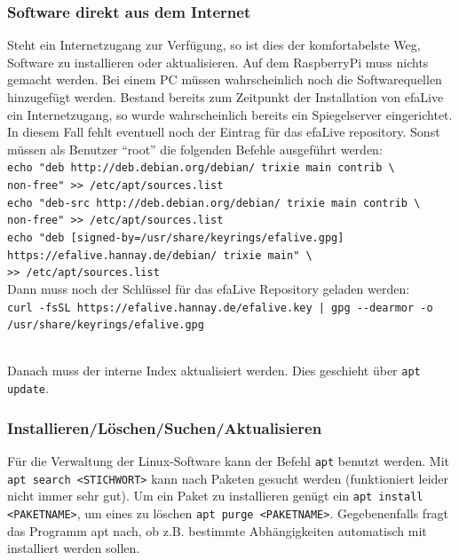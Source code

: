 \documentclass[a4paper,12pt,twoside]{article}
\begin{document}
\subsubsection{Software direkt aus dem Internet}
\label{sct:software_internet}
Steht ein Internetzugang zur Verfügung, so ist dies der komfortabelste
Weg, Software zu installieren oder aktualisieren. Auf dem RaspberryPi 
muss nichts gemacht werden. Bei einem PC müssen wahrscheinlich noch die
Softwarequellen hinzugefügt werden. Bestand bereits zum
Zeitpunkt der Installation von efaLive ein Internetzugang, so wurde
wahrscheinlich bereits ein Spiegelserver eingerichtet. In diesem Fall fehlt
eventuell noch der Eintrag für das efaLive repository. Sonst müssen als
Benutzer "`root"' die folgenden Befehle ausgeführt werden:
\bigskip
\\
\texttt{echo "deb http://deb.debian.org/debian/ trixie main contrib \textbackslash\\
    non-free"\ {\textgreater}{\textgreater} /etc/apt/sources.list}
\\
\texttt{echo "deb-src http://deb.debian.org/debian/ trixie main contrib \textbackslash\\
    non-free"\ {\textgreater}{\textgreater} /etc/apt/sources.list}
\\
\texttt{echo "deb [signed-by=/usr/share/keyrings/efalive.gpg] https://efalive.hannay.de/debian/ trixie main" \textbackslash\\
    {\textgreater}{\textgreater} /etc/apt/sources.list}  
\bigskip
\\  
Dann muss noch der Schlüssel für das efaLive Repository geladen werden:
\bigskip
\\
\texttt{curl -fsSL https://efalive.hannay.de/efalive.key | gpg -{}-dearmor -o /usr/share/keyrings/efalive.gpg}

\bigskip
\\
Danach muss der interne Index aktualisiert werden. Dies geschieht über
\texttt{apt update}.


\subsubsection{Installieren/Löschen/Suchen/Aktualisieren}
\label{sct:software_install}
Für die Verwaltung der
Linux-Software kann der Befehl \texttt{apt}
benutzt werden. Mit \texttt{apt search
{\textless}STICHWORT{\textgreater}} kann nach Paketen
gesucht werden (funktioniert leider nicht immer sehr gut). Um ein Paket
zu installieren genügt ein \texttt{apt install
{\textless}PAKETNAME{\textgreater}}, um eines zu löschen
\texttt{apt purge
{\textless}PAKETNAME{\textgreater}}. Gegebenenfalls fragt
das Programm apt nach, ob z.B. bestimmte Abhängigkeiten
automatisch mit installiert werden sollen.
\end{document}
